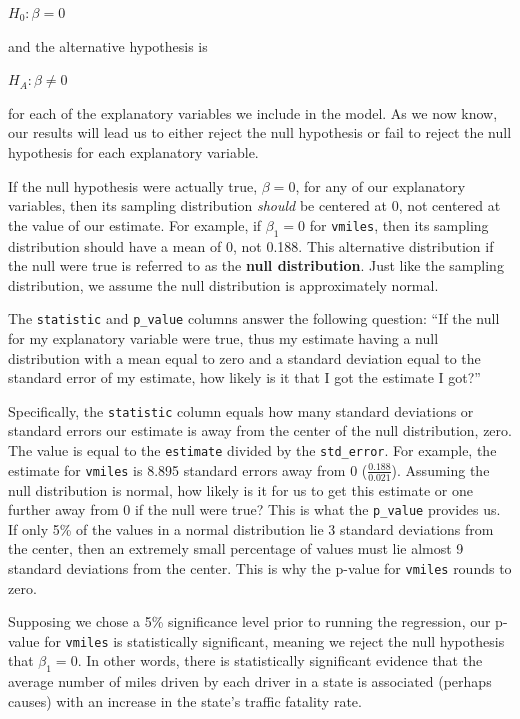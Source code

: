 \documentclass[
]{book}
\begin{document}
\(H_0: \beta=0\)

and the alternative hypothesis is

\(H_A: \beta \neq 0\)

for each of the explanatory variables we include in the model. As we now know, our results will lead us to either reject the null hypothesis or fail to reject the null hypothesis for each explanatory variable.

If the null hypothesis were actually true, \(\beta=0\), for any of our explanatory variables, then its sampling distribution \emph{should} be centered at 0, not centered at the value of our estimate. For example, if \(\beta_1=0\) for \texttt{vmiles}, then its sampling distribution should have a mean of 0, not 0.188. This alternative distribution if the null were true is referred to as the \textbf{null distribution}. Just like the sampling distribution, we assume the null distribution is approximately normal.

The \texttt{statistic} and \texttt{p\_value} columns answer the following question: ``If the null for my explanatory variable were true, thus my estimate having a null distribution with a mean equal to zero and a standard deviation equal to the standard error of my estimate, how likely is it that I got the estimate I got?''

Specifically, the \texttt{statistic} column equals how many standard deviations or standard errors our estimate is away from the center of the null distribution, zero. The value is equal to the \texttt{estimate} divided by the \texttt{std\_error}. For example, the estimate for \texttt{vmiles} is 8.895 standard errors away from 0 (\(\frac {0.188}{0.021}\)). Assuming the null distribution is normal, how likely is it for us to get this estimate or one further away from 0 if the null were true? This is what the \texttt{p\_value} provides us. If only 5\% of the values in a normal distribution lie 3 standard deviations from the center, then an extremely small percentage of values must lie almost 9 standard deviations from the center. This is why the p-value for \texttt{vmiles} rounds to zero.

Supposing we chose a 5\% significance level prior to running the regression, our p-value for \texttt{vmiles} is statistically significant, meaning we reject the null hypothesis that \(\beta_1=0\). In other words, there is statistically significant evidence that the average number of miles driven by each driver in a state is associated (perhaps causes) with an increase in the state's traffic fatality rate.
\end{document}
